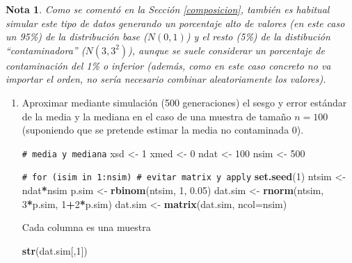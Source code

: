 \documentclass[
  spanish,
  10pt,
]{book}
\newenvironment{Shaded}{\begin{snugshade}}{\end{snugshade}}
\newcommand{\AttributeTok}[1]{\textcolor[rgb]{0.13,0.29,0.53}{#1}}
\newcommand{\CommentTok}[1]{\textcolor[rgb]{0.56,0.35,0.01}{\textit{#1}}}
\newcommand{\DecValTok}[1]{\textcolor[rgb]{0.00,0.00,0.81}{#1}}
\newcommand{\FloatTok}[1]{\textcolor[rgb]{0.00,0.00,0.81}{#1}}
\newcommand{\FunctionTok}[1]{\textcolor[rgb]{0.13,0.29,0.53}{\textbf{#1}}}
\newcommand{\NormalTok}[1]{#1}
\newcommand{\OtherTok}[1]{\textcolor[rgb]{0.56,0.35,0.01}{#1}}
\newcommand{\SpecialCharTok}[1]{\textcolor[rgb]{0.81,0.36,0.00}{\textbf{#1}}}
\theoremstyle{break}
\theoremstyle{nonumberplain}
\newtheorem{remark}{Nota}
\renewcommand{\CommentTok}[1]{\textcolor[rgb]{0.41,0.41,0.41}{\texttt{#1}}}
\begin{document}
\begin{remark}
Como se comentó en la Sección \ref{composicion}, también es habitual simular este tipo de datos generando un porcentaje alto de valores (en este caso un 95\%) de la distribución base (\(N(0,1)\)) y el resto (5\%) de la distibución ``contaminadora'' (\(N(3,3^2)\)), aunque se suele considerar un porcentaje de contaminación del 1\% o inferior (además, como en este caso concreto no va importar el orden, no sería necesario combinar aleatoriamente los valores).
\end{remark}

\vspace{0.5cm}

\begin{enumerate}
\def\labelenumi{\alph{enumi})}
\item
  Aproximar mediante simulación (500 generaciones) el sesgo y
  error estándar de la media y la mediana en el caso de una
  muestra de tamaño \(n=100\) (suponiendo que se pretende estimar la
  media no contaminada 0).

\begin{Shaded}
\begin{Highlighting}[]
\CommentTok{\# media y mediana}
\NormalTok{xsd }\OtherTok{\textless{}{-}} \DecValTok{1}
\NormalTok{xmed }\OtherTok{\textless{}{-}} \DecValTok{0}
\NormalTok{ndat }\OtherTok{\textless{}{-}} \DecValTok{100}
\NormalTok{nsim }\OtherTok{\textless{}{-}} \DecValTok{500}

\CommentTok{\# for (isim in 1:nsim) \# evitar matrix y apply}
\FunctionTok{set.seed}\NormalTok{(}\DecValTok{1}\NormalTok{)}
\NormalTok{ntsim }\OtherTok{\textless{}{-}}\NormalTok{ ndat}\SpecialCharTok{*}\NormalTok{nsim}
\NormalTok{p.sim }\OtherTok{\textless{}{-}} \FunctionTok{rbinom}\NormalTok{(ntsim, }\DecValTok{1}\NormalTok{, }\FloatTok{0.05}\NormalTok{)}
\NormalTok{dat.sim }\OtherTok{\textless{}{-}} \FunctionTok{rnorm}\NormalTok{(ntsim, }\DecValTok{3}\SpecialCharTok{*}\NormalTok{p.sim, }\DecValTok{1}\SpecialCharTok{+}\DecValTok{2}\SpecialCharTok{*}\NormalTok{p.sim)}
\NormalTok{dat.sim }\OtherTok{\textless{}{-}} \FunctionTok{matrix}\NormalTok{(dat.sim, }\AttributeTok{ncol=}\NormalTok{nsim)}
\end{Highlighting}
\end{Shaded}

  Cada columna es una muestra

\begin{Shaded}
\begin{Highlighting}[]
\FunctionTok{str}\NormalTok{(dat.sim[,}\DecValTok{1}\NormalTok{])}
\end{Highlighting}
\end{Shaded}


\end{enumerate}
\end{document}
